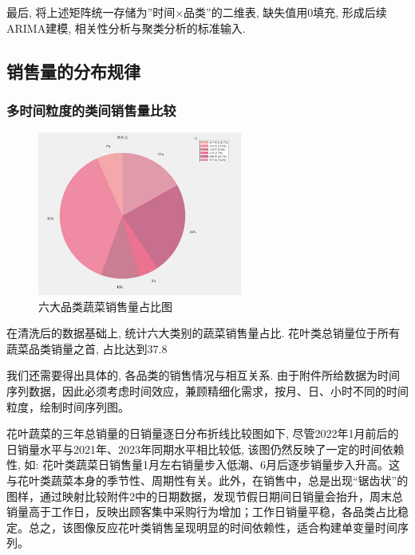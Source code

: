 \documentclass{MathNoteCN}
\begin{document}
最后, 将上述矩阵统一存储为''时间$\times$品类''的二维表, 缺失值用0填充, 形成后续ARIMA建模, 相关性分析与聚类分析的标准输入. 

\subsection{销售量的分布规律}

\subsubsection{多时间粒度的类间销售量比较}
\begin{figure}[H]
    \centering
    \includegraphics[width=0.6\textwidth]{销售量占比.png} 
    \caption{六大品类蔬菜销售量占比图}
\end{figure}

在清洗后的数据基础上, 统计六大类别的蔬菜销售量占比. 花叶类总销量位于所有蔬菜品类销量之首, 占比达到37.8%

我们还需要得出具体的, 各品类的销售情况与相互关系. 由于附件所给数据为时间序列数据，因此必须考虑时间效应，兼顾精细化需求，按月、日、小时不同的时间粒度，绘制时间序列图。

花叶蔬菜的三年总销量的日销量逐日分布折线比较图如下, 尽管2022年1月前后的日销量水平与2021年、2023年同期水平相比较低, 该图仍然反映了一定的时间依赖性, 如: 花叶类蔬菜日销售量1月左右销量步入低潮、6月后逐步销量步入升高。这与花叶类蔬菜本身的季节性、周期性有关。此外，在销售中，总是出现“锯齿状”的图样，通过映射比较附件2中的日期数据，发现节假日期间日销量会抬升，周末总销量高于工作日，反映出顾客集中采购行为增加；工作日销量平稳，各品类占比稳定。总之，该图像反应花叶类销售呈现明显的时间依赖性，适合构建单变量时间序列。
\end{document}
